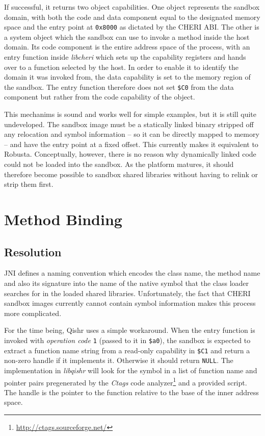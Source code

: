 \documentclass[a4paper,12pt,twoside,openright]{report}
\newcommand{\reg}[1]{\texttt{\$#1}}
\newcommand{\tool}[1]{\emph{#1}}
\newcommand{\lib}[1]{\tool{lib#1}}
\begin{document}
If successful, it returns two object capabilities. One object represents the sandbox domain, with both the code and data component equal to the designated memory space and the entry point at \texttt{0x8000} as dictated by the CHERI ABI. \label{sec:SystemObject} The other is a system object which the sandbox can use to invoke a method inside the host domain. Its code component is the entire address space of the process, with an entry function inside \lib{cheri} which sets up the capability registers and hands over to a function selected by the host. In order to enable it to identify the domain it was invoked from, the data capability is set to the memory region of the sandbox. The entry function therefore does not set \reg{C0} from the data component but rather from the code capability of the object.

This mechanims is sound and works well for simple examples, but it is still quite undeveloped. The sandbox image must be a statically linked binary stripped off any relocation and symbol information -- so it can be directly mapped to memory -- and have the entry point at a fixed offset. This currently makes it equivalent to Robusta. Conceptually, however, there is no reason why dynamically linked code could not be loaded into the sandbox. As the platform matures, it should therefore become possible to sandbox shared libraries without having to relink or strip them first.

\section{Method Binding}

\subsection{Resolution}

JNI defines a naming convention which encodes the class name, the method name and also its signature into the name of the native symbol that the class loader searches for in the loaded shared libraries. Unfortunately, the fact that CHERI sandbox images currently cannot contain symbol information makes this process more complicated.

For the time being, Qishr uses a simple workaround. When the entry function is invoked with \emph{operation code} \texttt{1} (passed to it in \reg{a0}), the sandbox is expected to extract a function name string from a read-only capability in \reg{C1} and return a non-zero handle if it implements it. Otherwise it should return \texttt{NULL}. The implementation in \lib{qishr} will look for the symbol in a list of function name and pointer pairs pregenerated by the \tool{Ctags} code analyzer\footnote{\url{http://ctags.sourceforge.net/}} and a provided script. The handle is the pointer to the function relative to the base of the inner address space.
\end{document}

